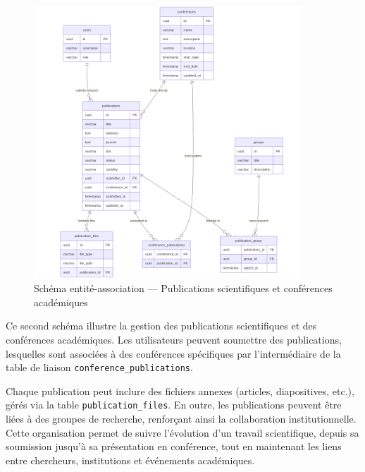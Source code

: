 \documentclass[12pt]{rapportPfe}
\begin{document}
\begin{figure}[H]
    \centering
    \includegraphics[width=0.9\textwidth]{diagrams/diagram7.png}
    \caption{Schéma entité-association — Publications scientifiques et conférences académiques}
    \label{fig:diagram7}
\end{figure}

Ce second schéma illustre la gestion des publications scientifiques et des conférences académiques. Les utilisateurs peuvent soumettre des publications, lesquelles sont associées à des conférences spécifiques par l’intermédiaire de la table de liaison \texttt{conference\_publications}. 

Chaque publication peut inclure des fichiers annexes (articles, diapositives, etc.), gérés via la table \texttt{publication\_files}. En outre, les publications peuvent être liées à des groupes de recherche, renforçant ainsi la collaboration institutionnelle. Cette organisation permet de suivre l’évolution d’un travail scientifique, depuis sa soumission jusqu’à sa présentation en conférence, tout en maintenant les liens entre chercheurs, institutions et événements académiques.
\end{document}
